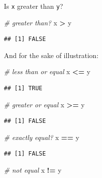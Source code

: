 \documentclass[
]{book}
\newenvironment{Shaded}{\begin{snugshade}}{\end{snugshade}}
\newcommand{\CommentTok}[1]{\textcolor[rgb]{0.56,0.35,0.01}{\textit{#1}}}
\newcommand{\NormalTok}[1]{#1}
\newcommand{\OperatorTok}[1]{\textcolor[rgb]{0.81,0.36,0.00}{\textbf{#1}}}
\newcommand{\StringTok}[1]{\textcolor[rgb]{0.31,0.60,0.02}{#1}}
\begin{document}
Is \texttt{x} greater than \texttt{y}?

\begin{Shaded}
\begin{Highlighting}[]
\CommentTok{\# greater than?}
\NormalTok{x }\OperatorTok{\textgreater{}}\StringTok{ }\NormalTok{y}
\end{Highlighting}
\end{Shaded}

\begin{verbatim}
## [1] FALSE
\end{verbatim}

And for the sake of illustration:

\begin{Shaded}
\begin{Highlighting}[]
\CommentTok{\# less than or equal}
\NormalTok{x }\OperatorTok{\textless{}=}\StringTok{ }\NormalTok{y}
\end{Highlighting}
\end{Shaded}

\begin{verbatim}
## [1] TRUE
\end{verbatim}

\begin{Shaded}
\begin{Highlighting}[]
\CommentTok{\# greater or equal}
\NormalTok{x }\OperatorTok{\textgreater{}=}\StringTok{ }\NormalTok{y}
\end{Highlighting}
\end{Shaded}

\begin{verbatim}
## [1] FALSE
\end{verbatim}

\begin{Shaded}
\begin{Highlighting}[]
\CommentTok{\# exactly equal?}
\NormalTok{x }\OperatorTok{==}\StringTok{ }\NormalTok{y}
\end{Highlighting}
\end{Shaded}

\begin{verbatim}
## [1] FALSE
\end{verbatim}

\begin{Shaded}
\begin{Highlighting}[]
\CommentTok{\# not equal}
\NormalTok{x }\OperatorTok{!=}\StringTok{ }\NormalTok{y}
\end{Highlighting}
\end{Shaded}
\end{document}
